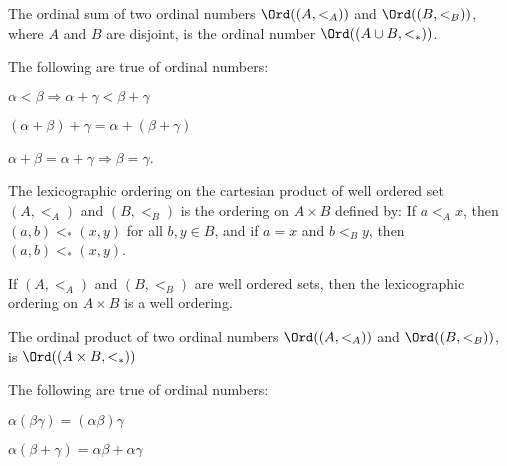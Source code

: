 \documentclass[crop=false,class=article,oneside]{standalone}
\begin{document}
        \begin{definition}
           The ordinal sum of two ordinal numbers
           $\Ord((A,<_{A}))$ and $\Ord((B,<_{B}))$,
           where $A$ and $B$ are disjoint,
           is the ordinal number
           $\Ord(({A}\cup{B},<_{*}))$.
        \end{definition}
        \begin{theorem*}
           The following are true of ordinal numbers:
           \begin{enumerate}
               \begin{multicols}{3}
                   \item $\alpha<\beta\Rightarrow%
                          \alpha+\gamma<\beta+\gamma$
                   \item $(\alpha+\beta)+\gamma%
                          =\alpha+(\beta+\gamma)$
                   \item $\alpha+\beta=\alpha+\gamma%
                          \Rightarrow\beta=\gamma$.
               \end{multicols}
           \end{enumerate}
        \end{theorem*}
        \begin{definition}
           The lexicographic ordering on the cartesian
           product of well ordered set $(A,<_{A})$ and
           $(B,<_{B})$ is the ordering on
           ${A}\times{B}$ defined by: If ${a}<_{A}{x}$,
           then $(a,b)<_{*}(x,y)$ for all $b,y\in{B}$, and
           if $a=x$ and $b<_{B}y$, then $(a,b)<_{*}(x,y)$.
        \end{definition}
        \begin{theorem*}
           If $(A,<_{A})$ and $(B,<_{B})$ are well ordered
           sets, then the lexicographic ordering
           on ${A}\times{B}$ is a well ordering.
        \end{theorem*}
        \begin{definition}
           The ordinal product of two ordinal numbers
           $\Ord((A,<_{A}))$ and $\Ord((B,<_{B}))$,
           is $\Ord(({A}\times{B},<_{*}))$
        \end{definition}
        \begin{theorem*}
           The following are true of ordinal numbers:
           \begin{enumerate}
               \begin{multicols}{2}
                   \item $\alpha(\beta\gamma)%
                          =(\alpha\beta)\gamma$
                   \item $\alpha(\beta+\gamma)%
                          =\alpha\beta+\alpha\gamma$
               \end{multicols}
           \end{enumerate}
        \end{theorem*}
\end{document}
